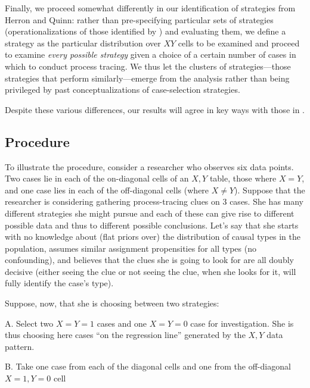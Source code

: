 \documentclass[12pt,]{book}
\begin{document}
Finally, we proceed somewhat differently in our identification of strategies from Herron and Quinn: rather than pre-specifying particular sets of strategies (operationalizations of those identified by \citet{SeawrightGerring2008}) and evaluating them, we define a strategy as the particular distribution over \(XY\) cells to be examined and proceed to examine \emph{every possible strategy} given a choice of a certain number of cases in which to conduct process tracing. We thus let the clusters of strategies---those strategies that perform similarly---emerge from the analysis rather than being privileged by past conceptualizations of case-selection strategies.

Despite these various differences, our results will agree in key ways with those in \citet{HerronQuinn}.

\hypertarget{procedure}{%
\subsection{Procedure}\label{procedure}}

To illustrate the procedure, consider a researcher who observes six data points. Two cases lie in each of the on-diagonal cells of an \(X,Y\) table, those where \(X=Y\), and one case lies in each of the off-diagonal cells (where \(X \neq Y\)). Suppose that the researcher is considering gathering process-tracing clues on 3 cases. She has many different strategies she might pursue and each of these can give rise to different possible data and thus to different possible conclusions. Let's say that she starts with no knowledge about (flat priors over) the distribution of causal types in the population, assumes similar assignment propensities for all types (no confounding), and believes that the clues she is going to look for are all doubly decisive (either seeing the clue or not seeing the clue, when she looks for it, will fully identify the case's type).

Suppose, now, that she is choosing between two strategies:

A. Select two \(X=Y=1\) cases and one \(X=Y=0\) case for investigation. She is thus choosing here cases ``on the regression line'' generated by the \(X,Y\) data pattern.

B. Take one case from each of the diagonal cells and one from the off-diagonal \(X=1, Y=0\) cell
\end{document}
